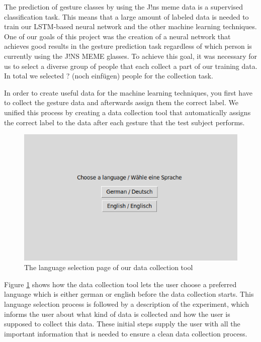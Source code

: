 \documentclass[runningheads]{llncs}
\begin{document}
The prediction of gesture classes by using the J!ns meme data is a supervised classification task. This means that a large amount of labeled data is needed to train our LSTM-based neural network and the other machine learning techniques. One of our goals of this project was the creation of a neural network that achieves good results in the gesture prediction task regardless of which person is currently using the J!NS MEME glasses. To achieve this goal, it was necessary for us to select a diverse group of people that each collect a part of our training data. In total we selected ? (noch einfügen) people for the collection task.
\par
In order to create useful data for the machine learning techniques, you first have to collect the gesture data and afterwards assign them the correct label. We unified this process by creating a data collection tool that automatically assigns the correct label to the data after each gesture that the test subject performs.
\begin{figure}
\centering
\centerline{\includegraphics[scale=0.5]{Language_Selection.png}}
\caption{The language selection page of our data collection tool}
\label{fig:gesturestart}
\end{figure}
Figure \ref{fig:gesturestart} shows how the data collection tool lets the user choose a preferred language which is either german or english before the data collection starts. This language selection process is followed by a description of the experiment, which informs the user about what kind of data is collected and how the user is supposed to collect this data. These initial steps supply the user with all the important information that is needed to ensure a clean data collection process.
\par
\end{document}

